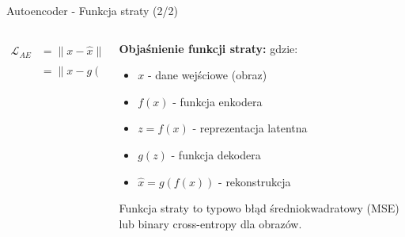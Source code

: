 \documentclass{beamer}
\begin{document}
\begin{frame}{Autoencoder - Funkcja straty (2/2)}
  \begin{columns}
    \begin{column}{0.5\textwidth}
      \begin{tcolorbox}[colback=yellow!10!white, colframe=black!60, boxrule=0.5pt, arc=3mm]
        \begin{align*}
          \mathcal{L}_{AE} &= \|x - \hat{x}\|^2 \\
          &= \|x - g(f(x))\|^2
        \end{align*}
      \end{tcolorbox}
    \end{column}
    \begin{column}{0.5\textwidth}
      \textbf{Objaśnienie funkcji straty:}
      \medskip
      gdzie:
      \begin{itemize}
        \item $x$ - dane wejściowe (obraz)
        \item $f(x)$ - funkcja enkodera
        \item $z = f(x)$ - reprezentacja latentna
        \item $g(z)$ - funkcja dekodera
        \item $\hat{x} = g(f(x))$ - rekonstrukcja
      \end{itemize}
      
      Funkcja straty to typowo błąd średniokwadratowy (MSE) lub binary cross-entropy dla obrazów.
    \end{column}
  \end{columns}
\end{frame}
\end{document}
